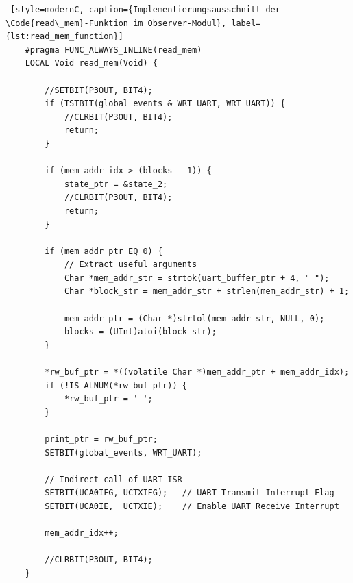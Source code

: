 \newpage
\begin{lstlisting} [style=modernC, caption={Implementierungsausschnitt der \Code{read\_mem}-Funktion im Observer-Modul}, label={lst:read_mem_function}]
	#pragma FUNC_ALWAYS_INLINE(read_mem)
	LOCAL Void read_mem(Void) {
		
		//SETBIT(P3OUT, BIT4);
		if (TSTBIT(global_events & WRT_UART, WRT_UART)) {
			//CLRBIT(P3OUT, BIT4);
			return;
		}
		
		if (mem_addr_idx > (blocks - 1)) {
			state_ptr = &state_2;
			//CLRBIT(P3OUT, BIT4);
			return;
		}
		
		if (mem_addr_ptr EQ 0) {
			// Extract useful arguments
			Char *mem_addr_str = strtok(uart_buffer_ptr + 4, " ");
			Char *block_str = mem_addr_str + strlen(mem_addr_str) + 1;
			
			mem_addr_ptr = (Char *)strtol(mem_addr_str, NULL, 0);
			blocks = (UInt)atoi(block_str);
		}
		
		*rw_buf_ptr = *((volatile Char *)mem_addr_ptr + mem_addr_idx);
		if (!IS_ALNUM(*rw_buf_ptr)) {
			*rw_buf_ptr = ' ';
		}
		
		print_ptr = rw_buf_ptr;
		SETBIT(global_events, WRT_UART);
		
		// Indirect call of UART-ISR
		SETBIT(UCA0IFG, UCTXIFG);   // UART Transmit Interrupt Flag
		SETBIT(UCA0IE,  UCTXIE);    // Enable UART Receive Interrupt
		
		mem_addr_idx++;
		
		//CLRBIT(P3OUT, BIT4);
	}
\end{lstlisting}

